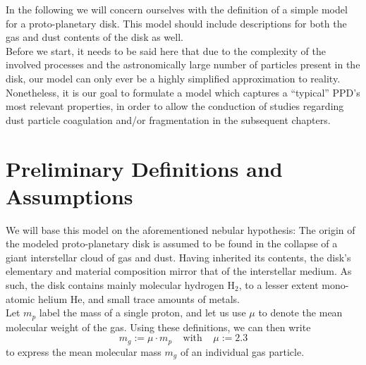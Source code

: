 
    In the following we will concern ourselves with the definition of a simple model for a 
    proto-planetary disk. This model should include descriptions for both the gas and dust 
    contents of the disk as well. \\

    Before we start, it needs to be said here that due to the complexity of the involved processes 
    and the astronomically large number of particles present in the disk, our model can 
    only ever be a highly simplified approximation to reality. \\
    
    Nonetheless, it is our goal to formulate a model which captures a ``typical'' PPD's most relevant
    properties, in order to allow the conduction of studies regarding dust particle coagulation 
    and/or fragmentation in the subsequent chapters.

\section{Preliminary Definitions and Assumptions}
\label{sec:first_assumptions_about_the_disk}

        We will base this model on the aforementioned nebular hypothesis: The origin of the modeled
        proto-planetary disk is assumed to be found in the collapse of a giant interstellar cloud
        of gas and dust. 
        Having inherited its contents, the disk's elementary and material composition mirror
        that of the interstellar medium. As such, the disk contains mainly molecular hydrogen
        $\text{H}_2$, to a lesser extent mono-atomic helium $\text{He}$, and small trace amounts 
        of metals. \\


        Let $m_p$ label the mass of a single proton, and let us use $\mu$ to denote the mean
        molecular weight of the gas. Using these definitions, we can then write 
        \begin{equation}
            m_g := \mu\cdot m_p
            \ \ \ \ \ \text{with} \ \ \ \ \
            \mu := 2.3
        \end{equation}
        to express the mean molecular mass $m_g$ of an individual gas particle. \\


